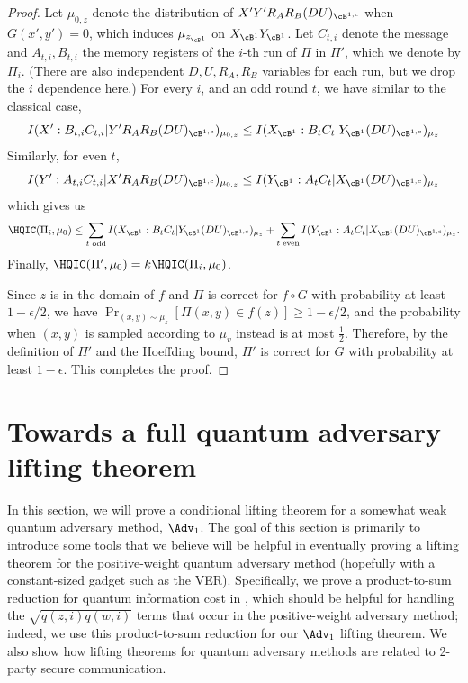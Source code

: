 \begin{proof}
Let $\mu_{0,z}$ denote the distribution of $X'Y'R_AR_B(DU)_{\cB^{1,c}}$ when $G(x',y')=0$, which induces $\mu_{z_{\cB^1}}$ on $X_{\cB^1}Y_{\cB^1}$. Let $C_{t,i}$ denote the message and $A_{t,i}, B_{t,i}$ the memory registers of the $i$-th run of $\Pi$ in $\Pi'$, which we denote by $\Pi_i$. (There are also independent $D, U, R_A, R_B$ variables for each run, but we drop the $i$ dependence here.) For every $i$, and an odd round $t$, we have similar to the classical case,
\[ I(X':B_{t,i}C_{t,i}|Y'R_AR_B(DU)_{\cB^{1,c}})_{\mu_{0,z}} \leq I(X_{\cB^1}:B_tC_t|Y_{\cB^1}(DU)_{\cB^{1,c}})_{\mu_z} \]
Similarly, for even $t$,
\[ I(Y':A_{t,i}C_{t,i}|X'R_AR_B(DU)_{\cB^{1,c}})_{\mu_{0,z}} \leq I(Y_{\cB^1}:A_tC_t|X_{\cB^1}(DU)_{\cB^{1,c}})_{\mu_z} \]
which gives us
\[ \HQIC(\Pi_i, \mu_0) \leq \sum_{t\text{ odd}}I(X_{\cB^1}:B_tC_t|Y_{\cB^1}(DU)_{\cB^{1,c}})_{\mu_z} + \sum_{t\text{ even}}I(Y_{\cB^1}:A_tC_t|X_{\cB^1}(DU)_{\cB^{1,c}})_{\mu_z}.\]
Finally, $\HQIC(\Pi', \mu_0) = k\HQIC(\Pi_i,\mu_0)$.

Since $z$ is in the domain of $f$ and $\Pi$ is correct for $f\circ G$ with probability at least $1-\epsilon/2$, we have $\Pr_{(x,y) \sim \mu_z}[\Pi(x,y) \in f(z)] \geq 1-\epsilon/2$, and the probability when $(x,y)$ is sampled according to $\mu_v$ instead is at most $\frac{1}{2}$. Therefore, by the definition of $\Pi'$ and the Hoeffding bound, $\Pi'$ is correct for $G$ with probability at least $1-\epsilon$. This completes the proof.
\end{proof}



\section{Towards a full quantum adversary lifting theorem}
\label{sec:Adv_one}

In this section, we will prove a conditional
lifting theorem for a somewhat weak
quantum adversary method, $\Adv_1$. The goal
of this section is primarily to introduce some tools
that we believe will be helpful in eventually
proving a lifting theorem for the positive-weight
quantum adversary method (hopefully
with a constant-sized gadget such as the \textsc{VER}).
Specifically, we prove a product-to-sum reduction
for quantum information cost in ,
which should be helpful for handling the
$\sqrt{q(z,i)q(w,i)}$ terms that occur in the positive-weight
adversary method; indeed, we use this product-to-sum
reduction for our $\Adv_1$ lifting theorem.
We also show how lifting theorems for quantum adversary
methods are related to 2-party secure communication.

